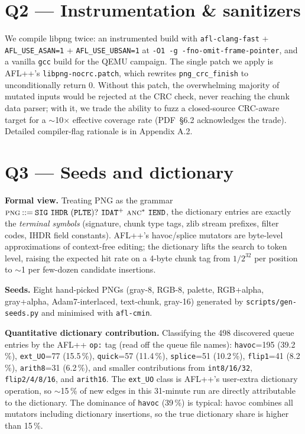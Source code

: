 \documentclass[letterpaper,twocolumn,10pt]{article}
\begin{document}
\section{Q2 — Instrumentation \& sanitizers}
\label{sec:q2}
We compile libpng twice: an instrumented build with
\texttt{afl-clang-fast} + \texttt{AFL\_USE\_ASAN=1} + \texttt{AFL\_USE\_UBSAN=1}
at \texttt{-O1 -g -fno-omit-frame-pointer}, and a vanilla \texttt{gcc}
build for the QEMU campaign. The single patch we apply is AFL++'s
\texttt{libpng-nocrc.patch}, which rewrites \texttt{png\_crc\_finish} to
unconditionally return 0. Without this patch, the overwhelming majority of
mutated inputs would be rejected at the CRC check, never reaching the chunk
data parser; with it, we trade the ability to fuzz a closed-source CRC-aware
target for a $\sim$10$\times$ effective coverage rate (PDF~§6.2 acknowledges
the trade). Detailed compiler-flag rationale is in Appendix A.2.

\section{Q3 — Seeds and dictionary}
\label{sec:q3}
\textbf{Formal view.}
Treating PNG as the grammar
$\textsc{png} \mathbin{::=} \texttt{SIG}\ \texttt{IHDR}\ (\texttt{PLTE})?\ \texttt{IDAT}^+\ \textsc{anc}^*\ \texttt{IEND}$,
the dictionary entries are exactly the \emph{terminal symbols} (signature, chunk
type tags, zlib stream prefixes, filter codes, IHDR field constants). AFL++'s
havoc/splice mutators are byte-level approximations of context-free editing;
the dictionary lifts the search to token level, raising the expected hit rate
on a 4-byte chunk tag from $1/2^{32}$ per position to $\sim$1 per few-dozen
candidate insertions.

\textbf{Seeds.}
Eight hand-picked PNGs (gray-8, RGB-8, palette, RGB+alpha, gray+alpha, Adam7-interlaced,
text-chunk, gray-16) generated by \texttt{scripts/gen-seeds.py} and minimised
with \texttt{afl-cmin}.

\textbf{Quantitative dictionary contribution.}
Classifying the 498 discovered queue entries by the AFL++ \texttt{op:} tag
(read off the queue file names): \texttt{havoc}=195 (39.2\,\%),
\texttt{ext\_UO}=77 (15.5\,\%), \texttt{quick}=57 (11.4\,\%),
\texttt{splice}=51 (10.2\,\%), \texttt{flip1}=41 (8.2\,\%),
\texttt{arith8}=31 (6.2\,\%), and smaller contributions from
\texttt{int8/16/32}, \texttt{flip2/4/8/16}, and \texttt{arith16}. The
\texttt{ext\_UO} class is AFL++'s user-extra dictionary operation, so
$\sim$15\,\% of new edges in this 31-minute run are
directly attributable to the dictionary. The dominance of \texttt{havoc}
(39\,\%) is typical: havoc combines all mutators including dictionary
insertions, so the true dictionary share is higher than 15\,\%.
\end{document}
